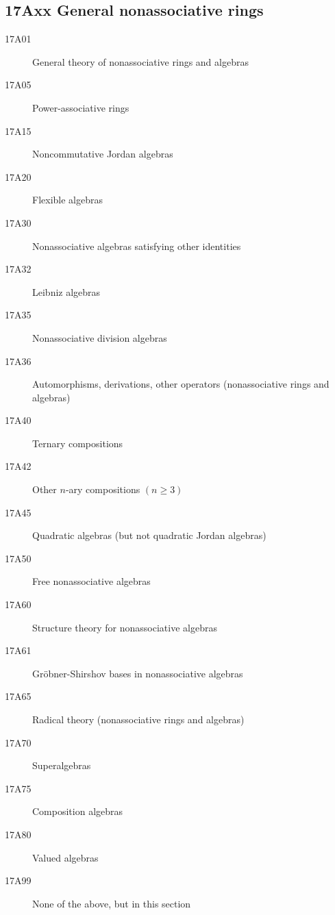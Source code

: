 \documentclass[letterpaper]{article}
\begin{document}
\subsection*{17Axx  General nonassociative rings }\label{17Axx}
\begin{description}  
\item [17A01]\label{17A01} General theory of nonassociative rings and algebras
\item [17A05]\label{17A05} Power-associative rings
\item [17A15]\label{17A15} Noncommutative Jordan algebras
\item [17A20]\label{17A20} Flexible algebras
\item [17A30]\label{17A30} Nonassociative algebras satisfying other identities
\item [17A32]\label{17A32} Leibniz algebras
\item [17A35]\label{17A35} Nonassociative division algebras
\item [17A36]\label{17A36} Automorphisms, derivations, other operators (nonassociative rings and algebras)
\item [17A40]\label{17A40} Ternary compositions
\item [17A42]\label{17A42} Other $n$-ary compositions $(n \ge 3)$
\item [17A45]\label{17A45} Quadratic algebras (but not quadratic Jordan algebras)
\item [17A50]\label{17A50} Free nonassociative algebras
\item [17A60]\label{17A60} Structure theory for nonassociative algebras
\item [17A61]\label{17A61} Gr\"obner-Shirshov bases in nonassociative algebras
\item [17A65]\label{17A65} Radical theory (nonassociative rings and algebras)
\item [17A70]\label{17A70} Superalgebras
\item [17A75]\label{17A75} Composition algebras
\item [17A80]\label{17A80} Valued algebras
\item [17A99]\label{17A99} None of the above, but in this section
\end{description}
\end{document}
